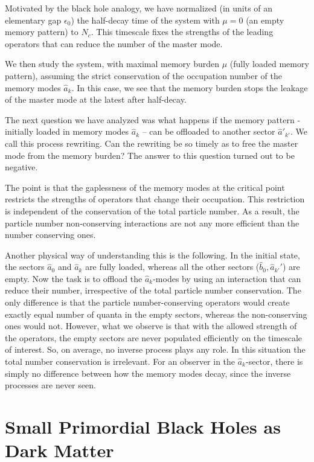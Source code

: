 \documentclass[aps,prd,reprint,superscriptaddress,nofootinbib]{revtex4-2}
\begin{document}
Motivated by the black hole analogy,  we have normalized 
(in units of 
an elementary gap $\epsilon_0$)
the half-decay time of the system with $\mu=0$ (an empty memory pattern)  to $N_c$.  This timescale fixes the strengths of the leading operators 
that can reduce the number of the master mode. 

We then study the system, with maximal memory burden 
$\mu$ (fully loaded memory pattern), 
assuming the strict conservation of the occupation number of the 
memory  modes $\hat{a}_k$. 
In this case, we see that the memory burden stops
the leakage of the master mode at the latest after half-decay. 

The next question we have analyzed was what happens if the memory pattern 
-
initially loaded in memory modes $\hat{a}_k$ -- can be offloaded to another 
sector $\hat{a}'_{k'}$.  We call this process rewriting. 
Can the rewriting be so timely as to free the master mode
from the memory burden?  
The answer to this question turned out to be negative. 

The point is that the gaplessness of the memory modes 
at the critical point restricts the strengths of operators that 
change their occupation. 
This restriction is independent of the conservation of the total particle 
number.  
As a result, the particle number non-conserving interactions are not any more efficient than the number conserving ones.

Another physical way of understanding this is the following. 
In the initial state, the sectors $\hat{a}_0$ and $\hat{a}_k$ are fully loaded, whereas 
all the other sectors ($\hat{b}_0, \hat{a}_{k'}'$) are empty.  
Now the task is to offload the  $\hat{a}_k$-modes by using an interaction 
that can reduce their number, irrespective of the total particle number conservation.  
The only difference  is that  the particle number-conserving operators 
would create exactly equal number of quanta in the empty sectors, whereas 
the non-conserving ones would not. 
However, what we observe is that with the allowed strength of the operators, 
the empty sectors are never populated 
efficiently on the timescale of interest.  
So, on average, no inverse process plays any role. 
In this situation the total number conservation is irrelevant.   
For an observer in the $\hat{a}_k$-sector, there is simply no 
difference between how the memory modes decay, since the inverse processes 
are never seen.  
 	




\section{Small Primordial Black Holes as Dark Matter}
\label{sec:primoridalBlackHoles}
\end{document}
